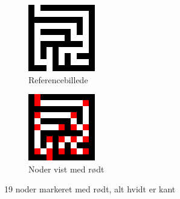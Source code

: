 \documentclass[a4paper, 12pt]{article}
\begin{document}
\begin{figure}[h]
    \centering
    \begin{subfigure}[b]{0.3\textwidth}
        \includegraphics[width=\textwidth]{img/example.png}
        \caption{Referencebillede}
    \end{subfigure}
    \begin{subfigure}[b]{0.3\textwidth}
        \includegraphics[width=\textwidth]{img/example_nodes.png}
        \caption{Noder vist med rødt}
        \label{fig:egnodes}
    \end{subfigure}
    \caption{19 noder markeret med rødt, alt hvidt er kant}
    \label{fig:nodes}
\end{figure}
\end{document}
